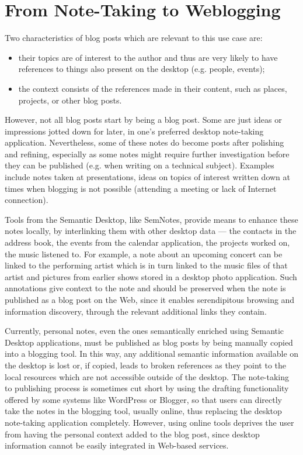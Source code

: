 \section{From Note-Taking to Weblogging}
\label{sec:reqsemblog}

Two characteristics of blog posts which are relevant to this use case are: 
\begin{itemize}
 \item their topics are of interest to the author and thus are very likely to have references to things also present on the desktop (e.g. people, events); 
 \item the context consists of the references made in their content, such as places, projects, or other blog posts.
\end{itemize}

However, not all blog posts start by being a blog post. Some are just ideas or impressions jotted down for later, in one's preferred desktop note-taking application. Nevertheless, some of these notes do become posts after polishing and refining, especially as some notes might require further investigation before they can be published (e.g. when writing on a technical subject). Examples include notes taken at presentations, ideas on topics of interest written down at times when blogging is not possible (attending a meeting or lack of Internet connection).

Tools from the Semantic Desktop, like SemNotes, provide means to enhance these notes locally, by interlinking them with other desktop data --- the contacts in the address book, the events from the calendar application, the projects worked on, the music listened to. 
For example, a note about an upcoming concert can be linked to the performing artist which is in turn linked to the music files of that artist and pictures from earlier shows stored in a desktop photo application.
Such annotations give context to the note and should be preserved when the note is published as a blog post on the Web, since it enables serendipitous browsing and information discovery, through the relevant additional links they contain.

Currently, personal notes, even the ones semantically enriched using Semantic Desktop applications, must be published as blog posts by being manually copied into a blogging tool.
In this way, any additional semantic information available on the desktop is lost or, if copied, leads to broken references as they point to the local resources which are not accessible outside of the desktop.
The note-taking to publishing process is sometimes cut short by using the drafting functionality offered by some systems like WordPress or Blogger, so that users can directly take the notes in the blogging tool, usually online, thus replacing the desktop note-taking application completely. However, using online tools deprives the user from having the personal context added to the blog post, since desktop information cannot be easily integrated in Web-based services.

